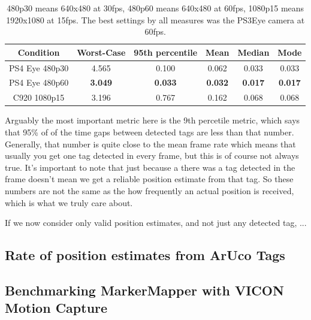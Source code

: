 \documentclass{article}
\begin{document}
    \begin{table}[H]
      \begin{tabular}{|c|c|c|c|c|c|} \hline
        Condition & Worst-Case & 95th percentile & Mean & Median & Mode \\ \hline
        PS4 Eye 480p30 & 4.565 & 0.100 & 0.062 & 0.033 & 0.033 \\ \hline
        PS4 Eye 480p60 & \textbf{3.049} & \textbf{0.033} & \textbf{0.032} & \textbf{0.017} & \textbf{0.017} \\ \hline
        C920 1080p15 & 3.196 & 0.767 & 0.162 & 0.068 & 0.068 \\ \hline
      \end{tabular}
      \caption{480p30 means 640x480 at 30fps, 480p60 means 640x480 at 60fps, 1080p15 means 1920x1080 at 15fps. The best settings by all measures was the PS3Eye camera at 60fps.}
      \label{table:tag_detection_comparison}
    \end{table}

    Arguably the most important metric here is the 9th percetile metric, which says that 95\% of of the time gaps between detected tags are less than that number. Generally, that number is quite close to the mean frame rate which means that usually you get one tag detected in every frame, but this is of course not always true. It's important to note that just because a there was a tag detected in the frame doesn't mean we get a reliable position estimate from that tag. So these numbers are not the same as the how frequently an actual position is received, which is what we truly care about.

    If we now consider only valid position estimates, and not just any detected tag, ... %


	\subsection{Rate of position estimates from ArUco Tags}

	\subsection{Benchmarking MarkerMapper with VICON Motion Capture}
\end{document}
